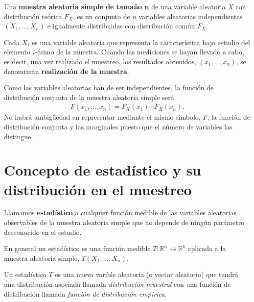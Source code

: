 \begin{defi}
    Una \textbf{muestra aleatoria simple de tamaño n} de una variable aleatoria $X$ con distribución teórica $F_X$, es un conjunto de $n$ variables aleatorias independientes $(X_1, ..., X_n)$ e igualmente distribuidas con distribución común $F_X$.
\end{defi}
Cada $X_i$ es una variable aleatoria que representa la característica bajo estudio del elemento $i$-ésimo de la muestra. Cuando las mediciones se hayan llevado a cabo, es decir, una vez realizado el muestreo, los resultados obtenidos, $(x_1, ..., x_n)$, se denomiarán \textbf{realización de la muestra}.

Como las variables aleatorias han de ser independientes, la función de distribución conjunta de la muestra aleatoria simple será
\begin{align*}
    F(x_1,...,x_n) = F_X(x_1) \dotsb F_X(x_n).
\end{align*}
No habrá ambig\"uedad en representar mediante el mismo símbolo, $F$, la función de distribución conjunta y las marginales puesto que el número de variables las distingue.

\section{Concepto de estadístico y su distribución en el muestreo}

\begin{defi}
    Llamamos \textbf{estadístico} a cualquier función medible de las variables aleatorias observables de la muestra aleatoria simple que no depende de ningún parámetro desconocido en el estudio.
\end{defi}

En general un estadístico es una función medible $T: \mathbb{R}^n \longrightarrow \mathbb{R}^k$ aplicada a la muestra aleatoria simple, $T(X_1, ..., X_n)$.

Un estadístico $T$ es una nueva varible aleatoria (o vector aleatorio) que tendrá una distribución asociada llamada \textit{distribución muestral} con una función de distribución llamada \textit{función de distribución empírica}.

